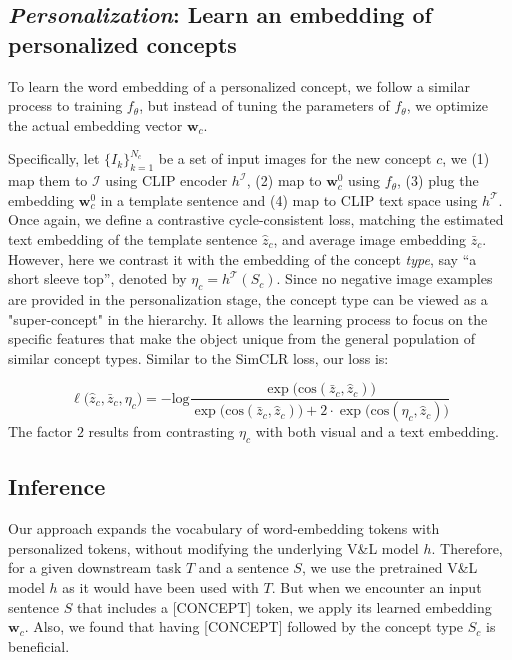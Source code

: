 \documentclass[runningheads]{llncs}
\newcommand\edit[1]{#1}
\newcommand{\cossim}[2]{\text{cos}(#1, #2)}
\renewcommand\vec[1]{\mathbf{#1}}
\newcommand{\ftheta}{f_\theta}
\newcommand{\w}{\vec{w}}
\newcommand{\VL}{V\&L {}}
\newcommand{\I}{\mathcal{I}}
\newcommand{\CLIPI}{h^{\mathcal{I}}}
\newcommand{\CLIPT}{h^{\mathcal{T}}}
\newcommand{\img}{I}
\newcommand{\concept}{[CONCEPT]}
\begin{document}
\subsection{\textit{Personalization}: Learn an embedding of personalized concepts}
To learn the word embedding of a personalized concept, we follow a similar process to training $\ftheta$, but instead of tuning the parameters of $\ftheta$, we optimize the actual embedding vector $\w_c$.

Specifically, let $\{\img_k\}_{k=1}^{N_c}$ be a set of input images for the new concept $c$, we (1) map them to $\I$ using CLIP encoder $\CLIPI$, (2) map to $\w^0_c$ using $\ftheta$, (3) plug the embedding $\w_c^0$ in a template sentence and (4) map to CLIP text space using $\CLIPT$. Once again, we define a contrastive cycle-consistent loss, matching the estimated text embedding of the template sentence $\hat{z}_c$, and average image embedding $\bar{z}_c$.
However, here we contrast it with the embedding of the concept \textit{type}, say ``a short sleeve top'', denoted by $\eta_c = \CLIPT(S_c)$. Since no negative image examples are provided in the personalization stage, the concept type can be viewed as a "super-concept" in the hierarchy. It allows the learning process to focus on the specific features that make the object unique from the general population of similar concept types. Similar to the SimCLR \cite{chen2020simple} loss, our loss is:


\begin{equation} \label{eq_coarse_loss}
    \ell\big(\hat{z}_c,\bar{z}_c,\eta_c \big) = -\text{log}\frac{\exp{\big( \cossim{\bar{z}_c}{\hat{z}_c} \big)}}{ \exp{\big(\cossim{\bar{z}_c}{\hat{z}_c} \big)} + 2\cdot\exp{\big(\cossim{\eta_c}{\hat{z}_c} \big)}}
\end{equation}
\edit{The factor $2$ results from contrasting  $\eta_c$ with both  visual and a text embedding.}






\subsection{Inference}
Our approach expands the vocabulary of word-embedding tokens with personalized tokens, without modifying the underlying \VL model $h$. Therefore, for a given downstream task $T$ and a sentence $S$, we use the pretrained \VL model $h$ as it would have been used with $T$. But when we encounter an input sentence $S$ that includes a \concept{} token,
we apply its learned embedding $\w_c$. Also, we found that having \concept{} followed by the concept type $S_c$ is beneficial.
\end{document}
